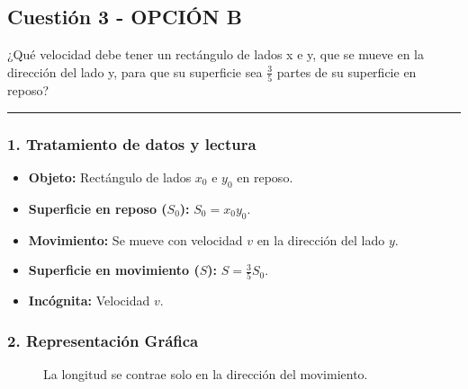 \newpage

\subsection{Cuestión 3 - OPCIÓN B}
\label{subsec:5B_2005_jun_cv}

\begin{cajaenunciado}
¿Qué velocidad debe tener un rectángulo de lados x e y, que se mueve en la dirección del lado y, para que su superficie sea $\frac{3}{5}$ partes de su superficie en reposo?
\end{cajaenunciado}
\hrule

\subsubsection*{1. Tratamiento de datos y lectura}
\begin{itemize}
    \item \textbf{Objeto:} Rectángulo de lados $x_0$ e $y_0$ en reposo.
    \item \textbf{Superficie en reposo ($S_0$):} $S_0 = x_0 y_0$.
    \item \textbf{Movimiento:} Se mueve con velocidad $v$ en la dirección del lado $y$.
    \item \textbf{Superficie en movimiento ($S$):} $S = \frac{3}{5} S_0$.
    \item \textbf{Incógnita:} Velocidad $v$.
\end{itemize}

\subsubsection*{2. Representación Gráfica}
\begin{figure}[H]
    \centering
    \caption{La longitud se contrae solo en la dirección del movimiento.}
\end{figure}

